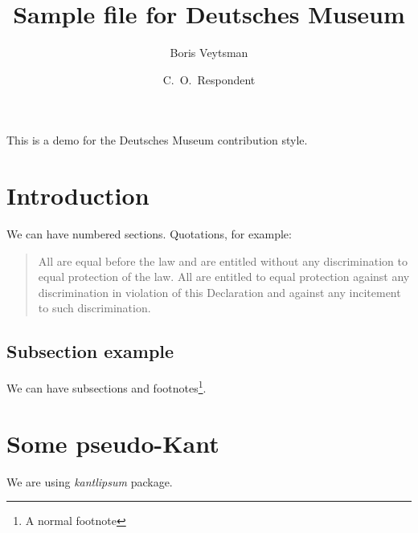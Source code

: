 \documentclass{deutschesmuseum}
\begin{document}
\title{Sample file for Deutsches Museum}
\author{Boris Veytsman \and C.~O.~Respondent}
\maketitle

This is a demo for the Deutsches Museum contribution style.

\section{Introduction}
\label{sec:intro}

We can have numbered sections.  Quotations, for
example\cite[][Article~7]{UNDeclaration}: 
\begin{quote}
  All are equal before the law and are entitled without any
  discrimination to equal protection of the law. All are entitled to
  equal protection against any discrimination in violation of this
  Declaration and against any incitement to such discrimination. 
\end{quote}

\subsection{Subsection example}
\label{sec:subsection}

We can have subsections and footnotes\footnote{A normal footnote}.


\section{Some pseudo-Kant}
\label{sec:kant}

We are using \textsl{kantlipsum} package\cite{kantlipsum}. 

\kant

\clearpage



\end{document}
